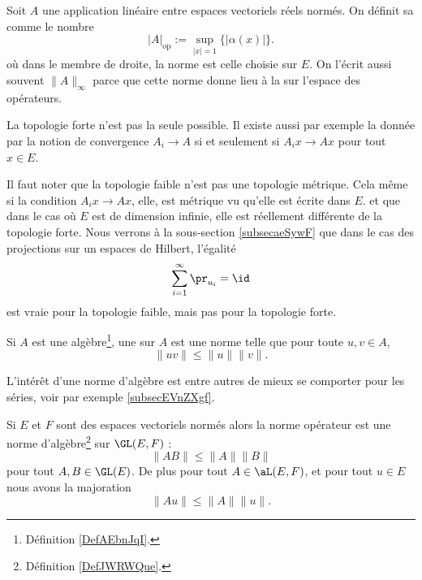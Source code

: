 \begin{definition}  \label{DefEWoiYTw}
	Soit $A$ une application linéaire entre espaces vectoriels réels normés. On définit sa  comme le nombre
	\begin{equation}\label{EqThUCEJ}
		|A|_{\mbox{op}}:=\sup_{|x|=1}\{|\alpha(x)|\}.
	\end{equation}
où dans le membre de droite, la norme est celle choisie sur \( E\). On l'écrit aussi souvent \( \| A \|_{\infty}\) parce que cette norme donne lieu à la  sur l'espace des opérateurs.
\end{definition}

La topologie forte n'est pas la seule possible. Il existe aussi par exemple la  donnée par la notion de convergence \( A_i\to A\) si et seulement si \( A_ix\to Ax\) pour tout \( x\in E\).

Il faut noter que la topologie faible n'est pas une topologie métrique. Cela même si la condition \( A_ix\to Ax\), elle, est métrique vu qu'elle est écrite dans \( E\).
et que dans le cas où \( E\) est de dimension infinie, elle est réellement différente de la topologie forte. Nous verrons à la sous-section \ref{subsecaeSywF} que dans le cas des projections sur un espaces de Hilbert, l'égalité
\begin{equation}
    \sum_{i=1}^{\infty}\pr_{u_i}=\id
\end{equation}
est vraie pour la topologie faible, mais pas pour la topologie forte.

\begin{definition}  \label{DefJWRWQue}
    Si \( A\) est une algèbre\footnote{Définition \ref{DefAEbnJqI}.}, une  sur \( A\) est une norme telle que pour toute \( u,v\in A\),
    \begin{equation}
        \| uv \|\leq \| u \|\| v \|.
    \end{equation}
\end{definition}
L'intérêt d'une norme d'algèbre est entre autres de mieux se comporter pour les séries, voir par exemple \ref{subsecEVnZXgf}.

\begin{proposition} \label{PropEDvSQsA}
    Si \( E\) et \( F\) sont des espaces vectoriels normés alors la norme opérateur est une norme d'algèbre\footnote{Définition \ref{DefJWRWQue}.} sur \( \GL(E,F)\) :
    \begin{equation}
        \| AB \|\leq \| A \|\| B \|
    \end{equation}
    pour tout \( A,B\in\GL(E)\). De plus pour tout \( A\in \aL(E,F)\), et pour tout \( u\in E\) nous avons la majoration
    \begin{equation}
        \| Au \|\leq \| A \|\| u \|.
    \end{equation}
\end{proposition}

